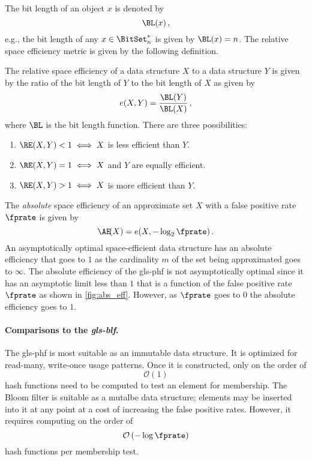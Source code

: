 The bit length of an object $x$ is denoted by
\begin{equation}
    \BL(x)\,,
\end{equation}
e.g., the bit length of any $x \in \BitSet^*_n$ is given by $\BL(x) = n$. The relative space efficiency metric is given by the following definition.
\begin{definition}
The relative space efficiency of a data structure $X$ to a data structure $Y$ is given by the ratio of the bit length of $Y$ to the bit length of $X$ as given by
\begin{equation}
    e(X,Y)=\frac{\BL(Y)}{\BL(X)}\,,
\end{equation}
where $\BL$ is the bit length function. There are three possibilities:
\begin{enumerate}
    \item $\RE(X,Y) < 1 \iff X$ is less efficient than $Y$.
    \item $\RE(X,Y) = 1 \iff X$ and $Y$ are equally efficient.
    \item $\RE(X,Y) > 1 \iff X$ is more efficient than $Y$.
\end{enumerate}
\end{definition}

The \emph{absolute} space efficiency of an approximate set $X$ with a false positive rate $\fprate$ is given by
\begin{equation}
    \AE\!(X) = e(X,-\log_2 \fprate)\,.
\end{equation}
An asymptotically optimal space-efficient data structure has an absolute efficiency that goes to $1$ as the cardinality $m$ of the set being approximated goes to $\infty$. The absolute efficiency of the \gls{gls-phf} is not asymptotically optimal since it has an asymptotic limit less than $1$ that is a function of the false positive rate $\fprate$ as shown in \cref{fig:abs_eff}. However, as $\fprate$ goes to $0$ the absolute efficiency goes to $1$.

\paragraph{Comparisons to the \emph{\gls{gls-blf}}.}
The \gls{gls-phf} is most suitable as an immutable data structure. It is optimized for read-many, write-once usage patterns. Once it is constructed, only on the order of
\begin{equation}
    \mathcal{O} \left( 1 \right)
\end{equation}
hash functions need to be computed to test an element for membership. The Bloom filter is suitable as a mutalbe data structure; elements may be inserted into it at any point at a cost of increasing the false positive rates. However, it requires computing on the order of
\begin{equation}
    \mathcal{O}\left(-\log \fprate\right)
\end{equation}
hash functions per membership test.

